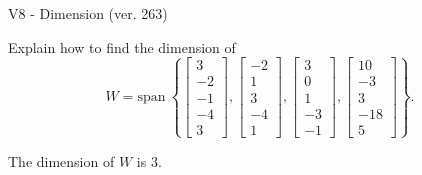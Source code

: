 \begin{exercise}
  \begin{exerciseTitle}V8 - Dimension (ver. 263)\end{exerciseTitle}
  \begin{exerciseStatement}
    Explain how to find the dimension of 
\[W=\mathrm{span}\ \left\{\left[\begin{array}{r}
3 \\
-2 \\
-1 \\
-4 \\
3
\end{array}\right] , \left[\begin{array}{r}
-2 \\
1 \\
3 \\
-4 \\
1
\end{array}\right] , \left[\begin{array}{r}
3 \\
0 \\
1 \\
-3 \\
-1
\end{array}\right] , \left[\begin{array}{r}
10 \\
-3 \\
3 \\
-18 \\
5
\end{array}\right]\right\}.\]



  \end{exerciseStatement}
  \begin{exerciseAnswer}
   The dimension of \(W\) is  \(3\).
  


  \end{exerciseAnswer}
\end{exercise}